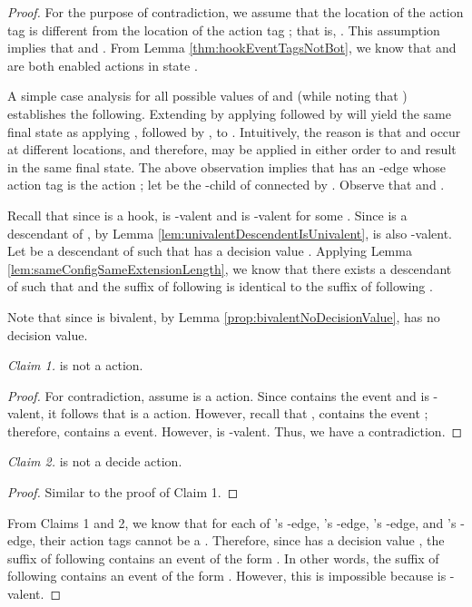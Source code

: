 \documentclass[11pt]{article}
\numberwithin{theorem}{section}
\begin{document}
\begin{proof}
For the purpose of contradiction, we assume that the location  of the action tag  is different from the location  of the action tag ; that is, .
This assumption implies that  and . From Lemma \ref{thm:hookEventTagsNotBot}, we know that  and  are both enabled actions in state . 

A simple case analysis for all possible values of  and  (while noting that ) establishes the following. Extending  by applying  followed by  will yield the same final state as applying , followed by , to . Intuitively, the reason is that  and  occur at different locations, and therefore, may be applied in either order to  and result in the same final state. The above observation implies that  has an -edge  whose action tag  is the action ; let  be the -child of  connected by .
Observe that  and .


Recall that since  is a hook,  is -valent and  is -valent for some . Since  is a descendant of , by Lemma \ref{lem:univalentDescendentIsUnivalent},  is also -valent. Let  be a descendant of  such that  has a decision value . 
Applying Lemma \ref{lem:sameConfigSameExtensionLength},  we know that there exists a descendant  of  such that  and the suffix of  following  is identical to the suffix of  following .

Note that since  is bivalent, by Lemma \ref{prop:bivalentNoDecisionValue},  has no decision value.

\emph{Claim 1.}  is not a  action.
\begin{proof}
For contradiction, assume  is a  action. Since  contains the event  and  is -valent, it follows that  is a  action. However, recall that ,  contains the event ; therefore,  contains a  event. However,  is -valent. Thus, we have a contradiction.
\end{proof}

\emph{Claim 2.}  is not a decide action.
\begin{proof}
Similar to the proof of Claim 1.
\end{proof}

 From Claims 1 and 2, we know that for each of  's -edge, 's -edge, 's -edge, and 's -edge, their action tags cannot be a . Therefore, since  has a decision value , the suffix of  following  contains an event of the form . In other words, the suffix of  following  contains an event of the form . However, this is impossible because  is -valent.
\end{proof}
\end{document}
